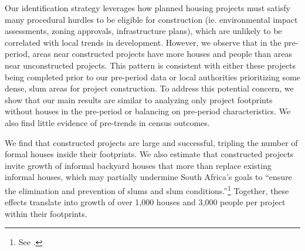 \documentclass[12pt]{article}
\begin{document}
Our identification strategy leverages how planned housing projects must satisfy many procedural hurdles to be eligible for construction (ie. environmental impact assessments, zoning approvals, infrastructure plans), which are unlikely to be correlated with local trends in development.  However, we observe that in the pre-period, areas near constructed projects have more houses and people than areas near unconstructed projects.  This pattern is consistent with either these projects being completed prior to our pre-period data or local authorities prioritizing some dense, slum areas for project construction.  To address this potential concern, we show that our main results are similar to analyzing only project footprints without houses in the pre-period or balancing on pre-period characteristics.  We also find little evidence of pre-trends in census outcomes.

We find that constructed projects are large and successful, tripling the number of formal houses inside their footprints.  We also estimate that constructed projects invite growth of informal backyard houses that more than replace existing informal houses, which may partially undermine South Africa's goals to ``ensure the elimination and prevention of slums and slum conditions.''\footnote{See \cite{housingact}.}  Together, these effects translate into growth of over 1,000 houses and 3,000 people per project within their footprints.









\end{document}
